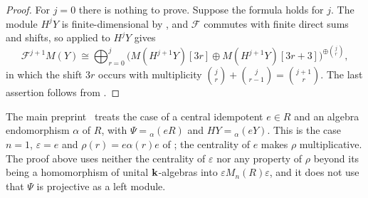 \begin{proof}
  For ${j=0}$ there is nothing to prove. Suppose the formula holds for $j$. The
  module $H^jY$ is finite-dimensional by , and
  $\mathcal{F}$ commutes with finite direct sums and shifts, so
   applied to $H^jY$ gives
  \[
    \mathcal{F}^{j+1}M(Y)\cong\bigoplus_{r=0}^{j}
    \bigl(M(H^{j+1}Y)[3r]\oplus M(H^{j+1}Y)[3r+3]\bigr)^{\oplus\binom{j}{r}},
  \]
  in which the shift $3r$ occurs with multiplicity
  ${\binom{j}{r}+\binom{j}{r-1}=\binom{j+1}{r}}$. The last assertion follows
  from .
\end{proof}

\begin{remark}
  \label{rem:realisation-special-case}
  The main preprint~\cite[Sections~3 and~4]{OAI26findim} treats the case of a
  central idempotent
  ${e\in R}$ and an algebra endomorphism $\alpha$ of $R$, with
  ${\Psi={}_\alpha(eR)}$ and ${HY={}_\alpha(eY)}$. This is the case ${n=1}$,
  ${\varepsilon=e}$ and ${\rho(r)=e\alpha(r)e}$ of ;
  the centrality of $e$ makes $\rho$ multiplicative. The proof above uses
  neither the centrality of $\varepsilon$ nor any property of $\rho$ beyond
  its being a homomorphism of unital $\mathbf{k}$-algebras into
  $\varepsilon M_n(R)\varepsilon$, and it does not use that $\Psi$ is
  projective as a left module.
\end{remark}
